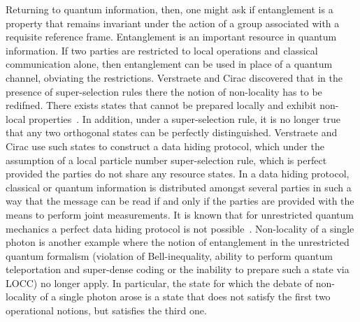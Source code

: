 \documentclass{article}
\begin{document}
Returning to quantum information, then, one might ask if entanglement is a property that remains invariant under the action of a group associated with a requisite reference frame. Entanglement is an important resource in quantum information.  If two parties are restricted to local operations and classical communication alone, then entanglement can be used in place of a quantum channel, obviating the restrictions.  Verstraete and Cirac discovered that in the presence of super-selection rules there the notion of non-locality has to be redifned.  There exists states that cannot be prepared locally and exhibit non-local properties~\cite{VC03}.  In addition, under a super-selection rule, it is no longer true that any two orthogonal states can be perfectly distinguished.  Verstraete and Cirac use such states to construct a data hiding protocol, which under the assumption of a local particle number super-selection rule, which is perfect provided the parties do not share any resource states.  In a data hiding protocol, classical or quantum information is distributed amongst several parties in such a way that the message can be read if and only if the parties are provided with the means to perform joint measurements.  It is known that for unrestricted quantum mechanics a perfect data hiding protocol is not possible~\cite{TDL01,DLT02}.  Non-locality of a single photon is another example where the notion of entanglement in the unrestricted quantum formalism (violation of Bell-inequality, ability to perform quantum teleportation and super-dense coding or the inability to prepare such a state via LOCC) no longer apply.  In particular, the state for which the debate of non-locality of a single photon arose is a state that does not satisfy the first two operational notions, but satisfies the third one.
\end{document}
